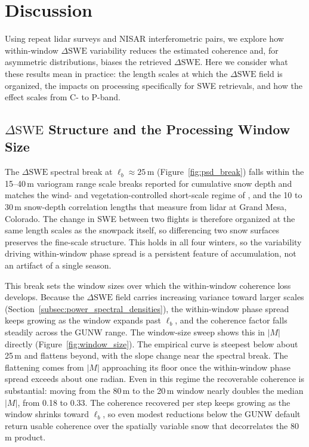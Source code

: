 \documentclass[tc, manuscript]{copernicus}
\begin{document}
\section{Discussion}\label{sec:discussion}

Using repeat lidar surveys and NISAR interferometric pairs, we explore how within-window $\Delta\mathrm{SWE}$ variability reduces the estimated coherence and, for asymmetric distributions, biases the retrieved $\Delta\mathrm{SWE}$. Here we consider what these results mean in practice: the length scales at which the $\Delta\mathrm{SWE}$ field is organized, the impacts on processing specifically for SWE retrievals, and how the effect scales from C- to P-band.

\subsection{$\Delta\mathrm{SWE}$ Structure and the Processing Window Size}\label{subsec:break-discussion}

The $\Delta\mathrm{SWE}$ spectral break at $\ell_b \approx 25$\,\unit{m} (Figure~\ref{fig:psd_break}) falls within the 15--40\,\unit{m} variogram range scale breaks reported for cumulative snow depth and matches the wind- and vegetation-controlled short-scale regime of \citet{trujillo2007topographic-0ec}, and the 10 to 30\,\unit{m} snow-depth correlation lengths that \citet{yueh2026interferometric-3ba} measure from lidar at Grand Mesa, Colorado. The change in SWE between two flights is therefore organized at the same length scales as the snowpack itself, so differencing two snow surfaces preserves the fine-scale structure. This holds in all four winters, so the variability driving within-window phase spread is a persistent feature of accumulation, not an artifact of a single season.

This break sets the window sizes over which the within-window coherence loss develops. Because the $\Delta\mathrm{SWE}$ field carries increasing variance toward larger scales (Section~\ref{subsec:power_spectral_densities}), the within-window phase spread keeps growing as the window expands past $\ell_b$, and the coherence factor falls steadily across the GUNW range. The window-size sweep shows this in $|M|$ directly (Figure~\ref{fig:window_size}). The empirical curve is steepest below about 25\,\unit{m} and flattens beyond, with the slope change near the spectral break. The flattening comes from $|M|$ approaching its floor once the within-window phase spread exceeds about one radian. Even in this regime the recoverable coherence is substantial: moving from the 80\,\unit{m} to the 20\,\unit{m} window nearly doubles the median $|M|$, from 0.18 to 0.33. The coherence recovered per step keeps growing as the window shrinks toward $\ell_b$, so even modest reductions below the GUNW default return usable coherence over the spatially variable snow that decorrelates the 80\,\unit{m} product.
\end{document}
